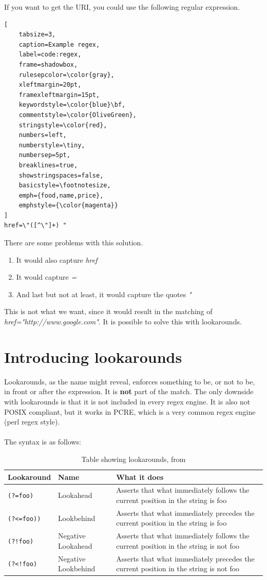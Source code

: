 If you want to get the URI, you could use the following regular expression.
\begin{lstlisting}[
	tabsize=3,
	caption=Example regex,
	label=code:regex,
	frame=shadowbox,
	rulesepcolor=\color{gray},
	xleftmargin=20pt,
	framexleftmargin=15pt,
	keywordstyle=\color{blue}\bf,
	commentstyle=\color{OliveGreen},
	stringstyle=\color{red},
	numbers=left,
	numberstyle=\tiny,
	numbersep=5pt,
	breaklines=true,
	showstringspaces=false,
	basicstyle=\footnotesize,
	emph={food,name,price},
	emphstyle={\color{magenta}}
]
href=\"([^\"]+) "
\end{lstlisting}
There are some problems with this solution.
\begin{enumerate}
\item It would also capture \textit{href}
\item It would capture \textit{=}
\item And last but not at least, it would capture the quotes \textit{"}
\end{enumerate}
This is not what we want, since it would result in the matching of \textit{href="http://www.google.com"}. It is possible to solve this with lookarounds.

\section{Introducing lookarounds}
\label{sec:introducing-lookarounds}
Lookarounds, as the name might reveal, enforces something to be, or not to be, in front or after the expression. It is \textbf{not} part of the match. The only downside with lookarounds is that it is not included in every regex engine. It is also not POSIX compliant, but it works in PCRE, which is a very common regex engine (perl regex style).
\\
\\
The syntax is as follows:\\
\begin{table}
\begin{tabular}{l | l || p{5cm}}
Lookaround & Name & What it does \\ \hline
\texttt{(?=foo)} & Lookahead & Asserts that what immediately follows the current position in the string is foo \\ \hline
\texttt{(?<=foo))} & Lookbehind & Asserts that what immediately precedes the current position in the string is foo \\ \hline
\texttt{(?!foo)} & Negative Lookahead & Asserts that what immediately follows the current position in the string is not foo \\ \hline
\texttt{(?<!foo)} & Negative Lookbehind & Asserts that what immediately precedes the current position in the string is not foo \\ \hline
\end{tabular}
\caption{Table showing lookarounds, from \cite{regex-lookaround}}
\end{table}

